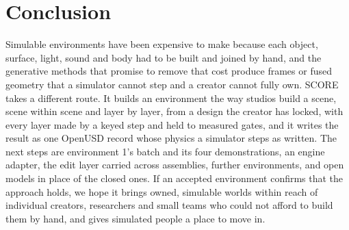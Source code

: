 \section{Conclusion}\label{conclusion}

Simulable environments have been expensive to make because each object, surface, light, sound and body had to be built and joined by hand, and the generative methods that promise to remove that cost produce frames or fused geometry that a simulator cannot step and a creator cannot fully own. SCORE takes a different route. It builds an environment the way studios build a scene, scene within scene and layer by layer, from a design the creator has locked, with every layer made by a keyed step and held to measured gates, and it writes the result as one OpenUSD record whose physics a simulator steps as written. The next steps are environment 1's batch and its four demonstrations, an engine adapter, the edit layer carried across assemblies, further environments, and open models in place of the closed ones. If an accepted environment confirms that the approach holds, we hope it brings owned, simulable worlds within reach of individual creators, researchers and small teams who could not afford to build them by hand, and gives simulated people a place to move in.
